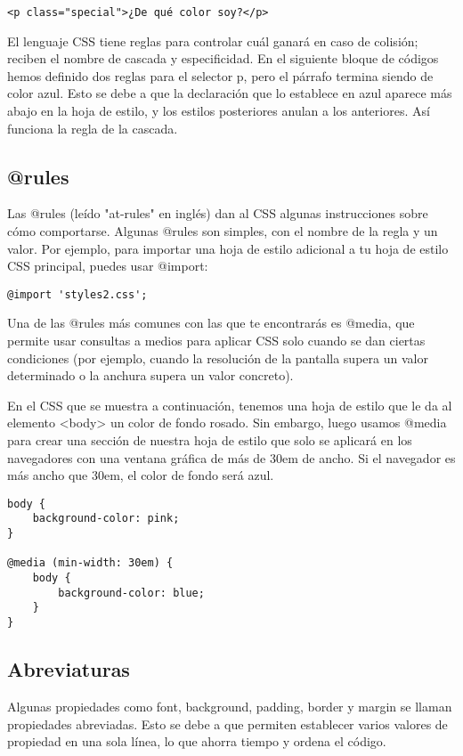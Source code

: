 \begin{enumerate}
\begin{lstlisting}
<p class="special">¿De qué color soy?</p>
\end{lstlisting}

El lenguaje CSS tiene reglas para controlar cuál ganará en caso de colisión; reciben el nombre de cascada y especificidad. En el siguiente bloque de códigos hemos definido dos reglas para el selector p, pero el párrafo termina siendo de color azul. Esto se debe a que la declaración que lo establece en azul aparece más abajo en la hoja de estilo, y los estilos posteriores anulan a los anteriores. Así funciona la regla de la cascada.

\subsection{@rules}
Las @rules (leído "at-rules" en inglés) dan al CSS algunas instrucciones sobre cómo comportarse. Algunas @rules son simples, con el nombre de la regla y un valor. Por ejemplo, para importar una hoja de estilo adicional a tu hoja de estilo CSS principal, puedes usar @import:

\begin{lstlisting}
@import 'styles2.css';
\end{lstlisting}

Una de las @rules más comunes con las que te encontrarás es @media, que permite usar consultas a medios para aplicar CSS solo cuando se dan ciertas condiciones (por ejemplo, cuando la resolución de la pantalla supera un valor determinado o la anchura supera un valor concreto).

En el CSS que se muestra a continuación, tenemos una hoja de estilo que le da al elemento <body> un color de fondo rosado. Sin embargo, luego usamos @media para crear una sección de nuestra hoja de estilo que solo se aplicará en los navegadores con una ventana gráfica de más de 30em de ancho. Si el navegador es más ancho que 30em, el color de fondo será azul.

\begin{lstlisting}
body {
	background-color: pink;
}

@media (min-width: 30em) {
	body {
		background-color: blue;
	}
}
\end{lstlisting}

\subsection{Abreviaturas}
Algunas propiedades como font, background, padding, border y margin se llaman propiedades abreviadas. Esto se debe a que permiten establecer varios valores de propiedad en una sola línea, lo que ahorra tiempo y ordena el código.


\end{enumerate}
